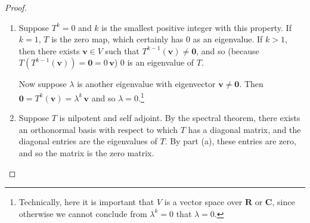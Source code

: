\documentclass[12pt]{amsart}
\def\0{\mathbf 0}
\def\v{\mathbf v}
\def\C{\mathbf{C}}
\def\R{\mathbf{R}}
\begin{document}
\begin{enumerate}
\begin{proof}
\begin{enumerate}
\item Suppose $T^k = 0$ and $k$ is the smallest positive integer with this property.
If $k = 1$, $T$ is the zero map, which certainly has 0 as an eigenvalue.
If $k > 1$, then there exists $\v \in V$ such that $T^{ k-1 } (\v) \ne \0$, and so (because $T \left( T^{ k-1 } (\v) \right) = \0 = 0 \, \v$) 0 is an eigenvalue of $T$.

Now suppose $\lambda$ is another eigenvalue with eigenvector $\v \ne \0$.
Then $\0 = T^k (\v) = \lambda^k \, \v$ and so $\lambda = 0$.\footnote{Technically, here it is important that $V$ is a vector space over $\R$ or $\C$, since otherwise we cannot conclude from $\lambda^k = 0$ that $\lambda = 0$.}

\item Suppose $T$ is nilpotent and self adjoint.
By the spectral theorem, there exists an orthonormal basis with respect to which $T$ has a diagonal matrix, and the diagonal entries are the eigenvalues of $T$. By part (a), these entries are zero, and so the matrix is the zero matrix. \qedhere

\end{enumerate}
\end{proof}

\end{enumerate}
\end{document}
